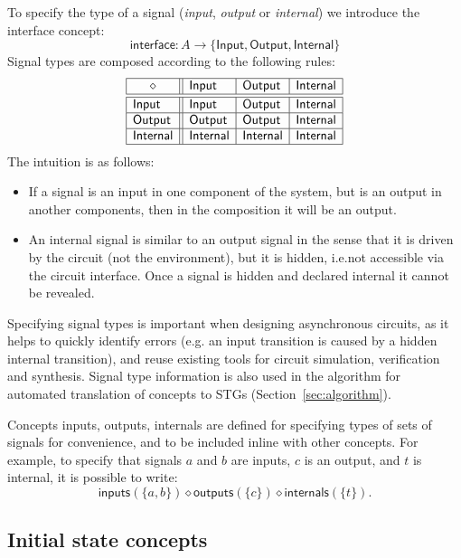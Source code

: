 \documentclass[british,conference,compsoc]{IEEEtran}
\begin{document}
To specify the type of a signal (\emph{input},
\emph{output} or \emph{internal}) we introduce the \textsf{interface} concept:
\[
\mathsf{interface} : A \rightarrow \{\mathsf{Input}, \mathsf{Output},
\mathsf{Internal}\}
\]
Signal types are composed according to the following rules:
\[
\begin{array}{|l||l|l|l|}
\hline
\multicolumn{1}{|c||}{\diamond} & \mathsf{Input} & \mathsf{Output} &
\mathsf{Internal} \\ \hline \hline
\mathsf{Input} & \mathsf{Input} & \mathsf{Output} & \mathsf{Internal} \\ \hline
\mathsf{Output} & \mathsf{Output} & \mathsf{Output} & \mathsf{Internal} \\
\hline
\mathsf{Internal}& \mathsf{Internal} & \mathsf{Internal} & \mathsf{Internal} \\
\hline
\end{array}
\]
The intuition is as follows:
\begin{itemize}
    \item If a signal is an input in one component of the system, but is an
    output in another components, then in the composition it will be an output.
    \item An internal signal is similar to an output signal in the sense
that it is driven by the circuit (not the environment), but it is hidden, i.e.not accessible via the circuit interface. Once a signal is hidden and declared    internal it cannot be revealed.
\end{itemize}

\noindent Specifying signal types is important when designing asynchronous
circuits, as it helps to quickly identify errors (e.g. an input transition is
caused by a hidden internal transition), and reuse existing tools for circuit
simulation, verification and synthesis. Signal type information is also used
in the algorithm for automated translation of concepts to
STGs (Section~\ref{sec:algorithm}).

Concepts \textsf{inputs}, \textsf{outputs}, \textsf{internals} are defined for
specifying types of sets of signals for convenience, and to be included inline with other
concepts. For example, to specify
that signals $a$ and $b$ are inputs, $c$ is an output, and $t$ is internal, it
is possible to write:
\[
\mathsf{inputs}(\{a, b\}) \diamond \mathsf{outputs}(\{c\}) \diamond
\mathsf{internals}(\{t\}).
\]


\subsection{Initial state concepts \label{sub:initState}}
\end{document}

